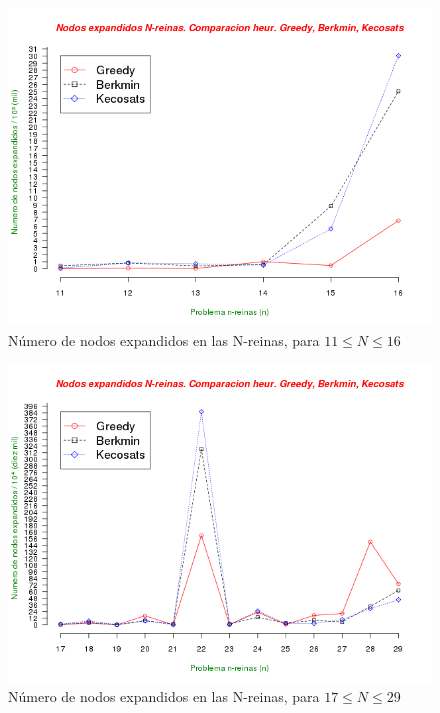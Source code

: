 \documentclass[12pt,lettersize,oneside]{article}
\begin{document}
\begin{figure}[!ht]\caption{Número de nodos expandidos en las N-reinas, para $11\leq
    N \leq 16$}
\label{NodosExpandidosReinasGrd}
\includegraphics[scale=0.82,angle=90]{reinas2Ver3.png}
\end{figure}

\begin{figure}[!ht]\caption{Número de nodos expandidos en las N-reinas, para $17\leq
    N \leq 29$}
\label{NodosExpandidosReinasGrd}
\includegraphics[scale=0.82,angle=90]{reinas3Ver3.png}
\end{figure}
\end{document}
